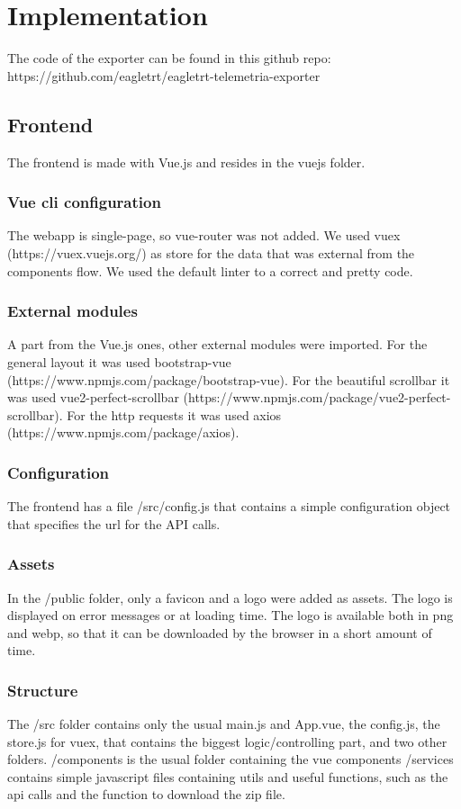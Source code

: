 \section{\huge{Implementation}}
The code of the exporter can be found in this github repo: https://github.com/eagletrt/eagletrt-telemetria-exporter

\subsection{Frontend}
The frontend is made with Vue.js and resides in the vuejs folder.

\subsubsection{Vue cli configuration}
The webapp is single-page, so vue-router was not added.
We used vuex (https://vuex.vuejs.org/) as store for the data that was external from the components flow.
We used the default linter to a correct and pretty code.

\subsubsection{External modules}
A part from the Vue.js ones, other external modules were imported. 
For the general layout it was used bootstrap-vue (https://www.npmjs.com/package/bootstrap-vue).
For the beautiful scrollbar it was used vue2-perfect-scrollbar (https://www.npmjs.com/package/vue2-perfect-scrollbar).
For the http requests it was used axios (https://www.npmjs.com/package/axios).

\subsubsection{Configuration}
The frontend has a file /src/config.js that contains a simple configuration object that specifies the url for the API calls.

\subsubsection{Assets}
In the /public folder, only a favicon and a logo were added as assets. The logo is displayed on error messages or 
at loading time.
The logo is available both in png and webp, so that it can be downloaded by the browser in a short amount of time.

\subsubsection{Structure}
The /src folder contains only the usual main.js and App.vue, the config.js, the store.js for vuex, that contains 
the biggest logic/controlling part, and two other folders. 
/components is the usual folder containing the vue components
/services contains simple javascript files containing utils and useful functions, such as the api calls and 
the function to download the zip file.

